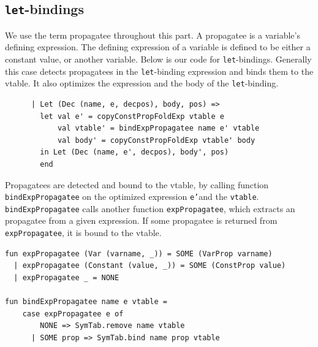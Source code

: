 \documentclass[11pt]{article}
\begin{document}
	\subsection{\texttt{let}-bindings}
	We use the term propagatee throughout this part. A propagatee is a variable's defining expression. The
	defining expression of a variable is defined to be either a constant value, or another variable. Below is
	our code for \texttt{let}-bindings. Generally this case detects propagatees in the
	\texttt{let}-binding expression and binds them to the vtable. It also optimizes the expression and the
	body of the \texttt{let}-binding.
	\begin{lstlisting}
      | Let (Dec (name, e, decpos), body, pos) =>
        let val e' = copyConstPropFoldExp vtable e
            val vtable' = bindExpPropagatee name e' vtable
            val body' = copyConstPropFoldExp vtable' body
        in Let (Dec (name, e', decpos), body', pos)
        end
	\end{lstlisting}
	Propagatees are detected and bound to the vtable, by calling function \texttt{bindExpPropagatee} on the optimized expression
	\texttt{e'}and the \texttt{vtable}. \texttt{bindExpPropagatee} calls another function \texttt{expPropagatee}, which extracts
	an propagatee from a given expression. If some propagatee is returned from \texttt{expPropagatee}, it is bound to the vtable.
	\begin{lstlisting}
fun expPropagatee (Var (varname, _)) = SOME (VarProp varname)
  | expPropagatee (Constant (value, _)) = SOME (ConstProp value)
  | expPropagatee _ = NONE

fun bindExpPropagatee name e vtable =
    case expPropagatee e of
        NONE => SymTab.remove name vtable
      | SOME prop => SymTab.bind name prop vtable
	\end{lstlisting}
\end{document}
